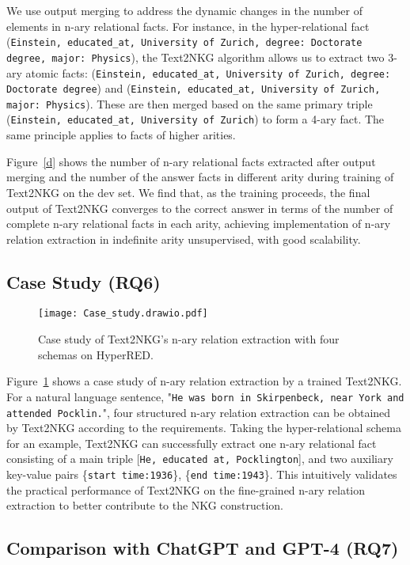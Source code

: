 \documentclass{article} \usepackage{iclr2024_conference,times}
\begin{document}
We use output merging to address the dynamic changes in the number of elements in n-ary relational facts. For instance, in the hyper-relational fact (\texttt{Einstein, educated\_at, University of Zurich, degree: Doctorate degree, major: Physics}), the Text2NKG algorithm allows us to extract two 3-ary atomic facts: (\texttt{Einstein, educated\_at, University of Zurich, degree: Doctorate degree}) and (\texttt{Einstein, educated\_at, University of Zurich, major: Physics}). These are then merged based on the same primary triple (\texttt{Einstein, educated\_at, University of Zurich}) to form a 4-ary fact. The same principle applies to facts of higher arities.

Figure~\ref{d} shows the number of n-ary relational facts extracted after output merging and the number of the answer facts in different arity during training of Text2NKG on the dev set. We find that, as the training proceeds, the final output of Text2NKG converges to the correct answer in terms of the number of complete n-ary relational facts in each arity, achieving implementation of n-ary relation extraction in indefinite arity unsupervised, with good scalability.


\subsection{Case Study (RQ6)}
\begin{figure}[t]
\centering
\texttt{[image: Case\_study.drawio.pdf]}
\caption{Case study of Text2NKG's n-ary relation extraction with four schemas on HyperRED.}
\label{case}
\end{figure}



Figure~\ref{case} shows a case study of n-ary relation extraction by a trained Text2NKG. For a natural language sentence, "\texttt{He was born in Skirpenbeck, near York and attended Pocklin.}", four structured n-ary relation extraction can be obtained by Text2NKG according to the requirements. Taking the hyper-relational schema for an example, Text2NKG can successfully extract one n-ary relational fact consisting of a main triple [\texttt{He, educated at, Pocklington}], and two auxiliary key-value pairs \{\texttt{start time:1936}\}, \{\texttt{end time:1943}\}. This intuitively validates the practical performance of Text2NKG on the fine-grained n-ary relation extraction to better contribute to the NKG construction. 

\subsection{Comparison with ChatGPT and GPT-4 (RQ7)}
\end{document}
